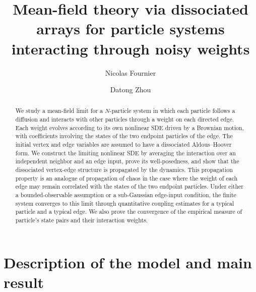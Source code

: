 \documentclass{amsart}
\begin{document}
\title[Mean-field theory via dissociated arrays]
{Mean-field theory via dissociated arrays for particle systems interacting through noisy weights}
\author{Nicolas Fournier}
\author{Datong Zhou}
\address{Nicolas Fournier, Sorbonne Universit\'e - LPSM (UMR 8001),
Campus Pierre et Marie Curie, Case courrier 158, 4 place Jussieu,
75252 Paris Cedex 05, France. \tt{nicolas.fournier@sorbonne-universite.fr}}
\address{Datong Zhou, Sorbonne Universit\'e - LPSM (UMR 8001) and LJLL (UMR 7598),
Campus Pierre et Marie Curie, Case courrier 158, 4 place Jussieu,
75252 Paris Cedex 05, France. \tt{datong.zhou@sorbonne-universite.fr}}

\begin{abstract}
We study a mean-field limit for a $N$-particle system in which each particle
follows a diffusion and interacts with other particles through a weight on each directed edge. Each weight evolves according to
its own nonlinear SDE driven by a Brownian motion, with coefficients involving the states of the two endpoint particles of the edge. The initial vertex and edge variables are assumed to have a dissociated Aldous--Hoover form. We construct the limiting nonlinear SDE by averaging the interaction over an independent neighbor and an edge input, prove its well-posedness, and show that the
dissociated vertex-edge structure is propagated by the dynamics. This
propagation property is an analogue of propagation of chaos in the case where the weight of each edge may remain correlated with the states of the two endpoint particles. Under either a bounded-observable assumption or a sub-Gaussian edge-input condition, the finite system converges to this limit through quantitative coupling estimates for a
typical particle and a typical edge. We also prove the convergence of the empirical
measure of particle's state pairs and their interaction weights.
\end{abstract}




\maketitle

\section{Description of the model and main result}
\end{document}
